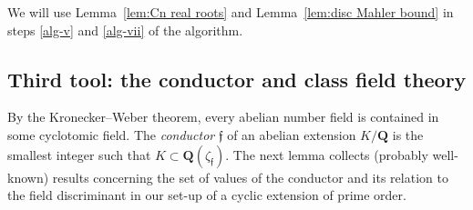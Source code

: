 \documentclass[12pt,reqno]{amsart}
\theoremstyle{definition}
\theoremstyle{plain}
\theoremstyle{definition}
\newcommand{\mf}{\mathfrak}
\newcommand{\Q}{\mathbf{Q}}
\begin{document}
We will use Lemma~\ref{lem:Cn real roots} and Lemma~\ref{lem:disc Mahler bound} in steps \eqref{alg-v} and \eqref{alg-vii} of the algorithm. 

\subsection{Third tool: the conductor and class field theory}
\label{subsec:Ramification theory}
By the Kronecker--Weber theorem, every abelian number field is contained in some cyclotomic field. The \emph{conductor} $\mf{f}$ of an abelian extension $K/\Q$ is the smallest integer such that $K \subset \Q(\zeta_{\mf{f}})$. The next lemma collects (probably well-known) results concerning the set of values of the conductor and its relation to the field discriminant in our set-up of a cyclic extension of prime order. 
\end{document}
